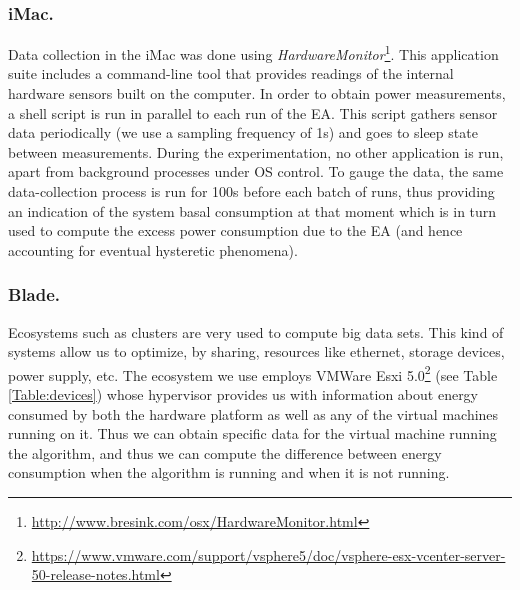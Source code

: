 \subsubsection*{iMac.}
Data collection in the iMac was done using \emph{HardwareMonitor}\footnote{\url{http://www.bresink.com/osx/HardwareMonitor.html}}. 
This application suite includes a command-line tool that provides readings of the internal
hardware sensors built on the computer. In order to obtain power measurements, a shell
script is run in parallel to each run of the EA. This script gathers sensor data periodically
(we use a sampling frequency of 1s) and goes to sleep state between measurements. 
During the experimentation, no other application is run, apart from background processes 
under OS control. 
To gauge the data,
the same data-collection process is run for 100s before each batch of runs, thus providing
an indication of the system basal consumption at that moment which is in turn used to 
compute the excess power consumption due to the EA (and hence accounting for
eventual hysteretic phenomena).

\subsubsection*{Blade.}

Ecosystems such as clusters are very used to compute big data sets. This kind of systems allow us to optimize, by sharing, resources like ethernet, storage devices, power supply, etc. %
The ecosystem we use employs VMWare Esxi 5.0\footnote{\url{https://www.vmware.com/support/vsphere5/doc/vsphere-esx-vcenter-server-50-release-notes.html}} (see Table \ref{Table:devices}) whose hypervisor provides us with information about energy consumed by both the hardware platform as well as any of the virtual machines running on it.  Thus we can obtain specific data for the virtual machine running the algorithm, and thus we can compute the difference between energy consumption when the algorithm is running and when it is not running.  

